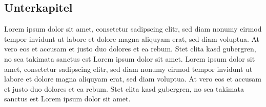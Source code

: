 \subsection{Unterkapitel}
Lorem ipsum dolor sit amet, consetetur sadipscing elitr, sed diam nonumy eirmod tempor invidunt ut labore et dolore magna aliquyam erat, sed diam voluptua. At vero eos et accusam et justo duo dolores et ea rebum. Stet clita kasd gubergren, no sea takimata sanctus est Lorem ipsum dolor sit amet. Lorem ipsum dolor sit amet, consetetur sadipscing elitr, sed diam nonumy eirmod tempor invidunt ut labore et dolore magna aliquyam erat, sed diam voluptua. At vero eos et accusam et justo duo dolores et ea rebum. Stet clita kasd gubergren, no sea takimata sanctus est Lorem ipsum dolor sit amet.
